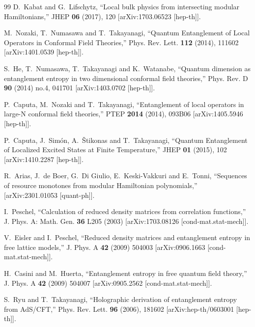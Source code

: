 \documentclass[aps,prl,twocolumn,showpacs,preprintnumbers,amsmath,amssymb]{revtex4-1}
\begin{document}
\begin{thebibliography}{99}
D.~Kabat and G.~Lifschytz,
``Local bulk physics from intersecting modular Hamiltonians,''
JHEP \textbf{06} (2017), 120
[arXiv:1703.06523 [hep-th]].

M.~Nozaki, T.~Numasawa and T.~Takayanagi,
``Quantum Entanglement of Local Operators in Conformal Field Theories,''
Phys. Rev. Lett. \textbf{112} (2014), 111602
[arXiv:1401.0539 [hep-th]].

S.~He, T.~Numasawa, T.~Takayanagi and K.~Watanabe,
``Quantum dimension as entanglement entropy in two dimensional conformal field theories,''
Phys. Rev. D \textbf{90} (2014) no.4, 041701
[arXiv:1403.0702 [hep-th]].

P.~Caputa, M.~Nozaki and T.~Takayanagi,
``Entanglement of local operators in large-N conformal field theories,''
PTEP \textbf{2014} (2014), 093B06
[arXiv:1405.5946 [hep-th]].

P.~Caputa, J.~Sim\'on, A.~\v{S}tikonas and T.~Takayanagi,
``Quantum Entanglement of Localized Excited States at Finite Temperature,''
JHEP \textbf{01} (2015), 102
[arXiv:1410.2287 [hep-th]].

R.~Arias, J.~de Boer, G.~Di Giulio, E.~Keski-Vakkuri and E.~Tonni,
``Sequences of resource monotones from modular Hamiltonian polynomials,''
[arXiv:2301.01053 [quant-ph]].

I.~Peschel,
``Calculation of reduced density matrices from correlation functions,''
J. Phys. A: Math. Gen. {\bf 36} L205 (2003)
[arXiv:1703.08126 [cond-mat.stat-mech]].

V.~Eisler and  I.~Peschel,
``Reduced density matrices and entanglement entropy in free lattice models,''
J. Phys. A {\bf 42} (2009) 504003
[arXiv:0906.1663 [cond-mat.stat-mech]].

H.~Casini and  M.~Huerta,
``Entanglement entropy in free quantum field theory,''
J. Phys. A {\bf 42} (2009) 504007
[arXiv:0905.2562 [cond-mat.stat-mech]].


S.~Ryu and T.~Takayanagi,
``Holographic derivation of entanglement entropy from AdS/CFT,''
Phys. Rev. Lett. \textbf{96} (2006), 181602
[arXiv:hep-th/0603001 [hep-th]].


\end{thebibliography}
\end{document}
